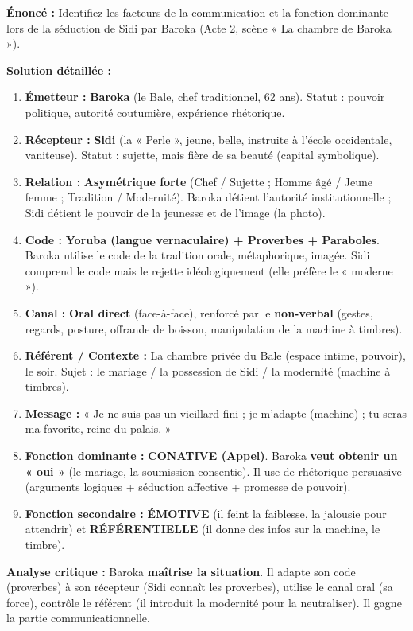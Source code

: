 \documentclass[11pt]{article}
\begin{document}
\begin{exoresolu}
\textbf{Énoncé :} Identifiez les facteurs de la communication et la fonction dominante lors de la séduction de Sidi par Baroka (Acte 2, scène « La chambre de Baroka »).

\tcblower

\textbf{Solution détaillée :}
\begin{enumerate}
    \item \textbf{Émetteur :} \textbf{Baroka} (le Bale, chef traditionnel, 62 ans). Statut : pouvoir politique, autorité coutumière, expérience rhétorique.
    \item \textbf{Récepteur :} \textbf{Sidi} (la « Perle », jeune, belle, instruite à l'école occidentale, vaniteuse). Statut : sujette, mais fière de sa beauté (capital symbolique).
    \item \textbf{Relation :} \textbf{Asymétrique forte} (Chef / Sujette ; Homme âgé / Jeune femme ; Tradition / Modernité). Baroka détient l'autorité institutionnelle ; Sidi détient le pouvoir de la jeunesse et de l'image (la photo).
    \item \textbf{Code :} \textbf{Yoruba (langue vernaculaire) + Proverbes + Paraboles}. Baroka utilise le code de la tradition orale, métaphorique, imagée. Sidi comprend le code mais le rejette idéologiquement (elle préfère le « moderne »).
    \item \textbf{Canal :} \textbf{Oral direct} (face-à-face), renforcé par le \textbf{non-verbal} (gestes, regards, posture, offrande de boisson, manipulation de la machine à timbres).
    \item \textbf{Référent / Contexte :} La chambre privée du Bale (espace intime, pouvoir), le soir. Sujet : le mariage / la possession de Sidi / la modernité (machine à timbres).
    \item \textbf{Message :} « Je ne suis pas un vieillard fini ; je m'adapte (machine) ; tu seras ma favorite, reine du palais. »
    \item \textbf{Fonction dominante :} \textbf{CONATIVE (Appel)}. Baroka \textbf{veut obtenir un « oui »} (le mariage, la soumission consentie). Il use de rhétorique persuasive (arguments logiques + séduction affective + promesse de pouvoir).
    \item \textbf{Fonction secondaire :} \textbf{ÉMOTIVE} (il feint la faiblesse, la jalousie pour attendrir) et \textbf{RÉFÉRENTIELLE} (il donne des infos sur la machine, le timbre).
\end{enumerate}
\textbf{Analyse critique :} Baroka \textbf{maîtrise la situation}. Il adapte son code (proverbes) à son récepteur (Sidi connaît les proverbes), utilise le canal oral (sa force), contrôle le référent (il introduit la modernité pour la neutraliser). Il gagne la partie communicationnelle.
\end{exoresolu}
\end{document}
